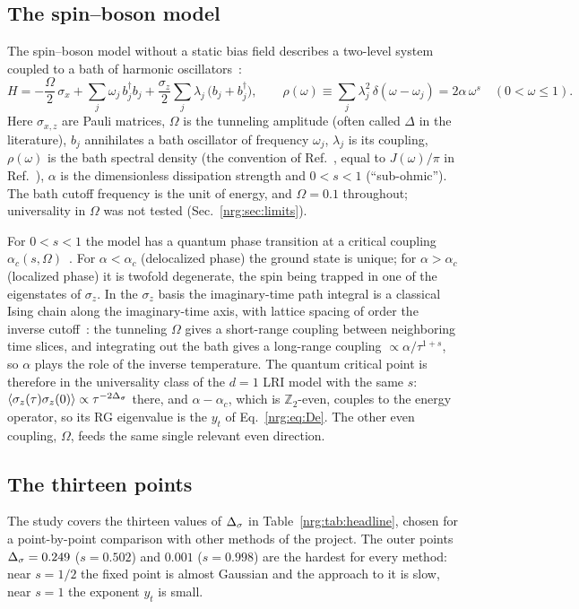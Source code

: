 \subsection{The spin--boson model}
The spin--boson model without a static bias field describes a two-level system coupled to a bath of harmonic
oscillators~\cite{nrg:Leggett1987}:
\begin{equation}
H=-\frac{\Omega}{2}\,\sigma_x+\sum_j\omega_j\,b_j^\dagger b_j+\frac{\sigma_z}{2}\sum_j\lambda_j\,\big(b_j+b_j^\dagger\big),\qquad
\rho(\omega)\equiv\sum_j\lambda_j^2\,\delta(\omega-\omega_j)=2\alpha\,\omega^{s}\quad(0<\omega\le1).
\label{nrg:eq:H}
\end{equation}
Here $\sigma_{x,z}$ are Pauli matrices, $\Omega$ is the tunneling amplitude (often called $\Delta$ in the literature), $b_j$
annihilates a bath oscillator of frequency
$\omega_j$, $\lambda_j$ is its coupling, $\rho(\omega)$ is the bath spectral density (the convention of Ref.~\cite{nrg:Bulla2003}, equal to
$J(\omega)/\pi$ in Ref.~\cite{nrg:Leggett1987}), $\alpha$ is the dimensionless dissipation strength and $0<s<1$ (``sub-ohmic''). The bath
cutoff frequency is the unit of energy, and $\Omega=0.1$ throughout; universality in $\Omega$ was not tested (Sec.~\ref{nrg:sec:limits}).

For $0<s<1$ the model has a quantum phase transition at a critical coupling $\alpha_c(s,\Omega)$~\cite{nrg:Bulla2003,nrg:Vojta2006}. For
$\alpha<\alpha_c$ (delocalized phase) the ground state is unique; for $\alpha>\alpha_c$ (localized phase) it is twofold degenerate,
the spin being trapped in one of the eigenstates of $\sigma_z$. In the $\sigma_z$ basis the imaginary-time path integral is a classical
Ising chain along the imaginary-time axis, with lattice spacing of order the inverse cutoff~\cite{nrg:Leggett1987,nrg:Vojta2006}: the
tunneling $\Omega$ gives a short-range coupling between neighboring time slices, and integrating out the bath gives a long-range
coupling $\propto\alpha/\tau^{1+s}$, so $\alpha$ plays the role of the inverse temperature. The quantum critical point is therefore in
the universality class of the $d=1$ LRI model with the same $s$: $\langle\sigma_z(\tau)\sigma_z(0)\rangle\propto\tau^{-2\Delta_\sigma}$ there,
and $\alpha-\alpha_c$, which is $\mathbb Z_2$-even, couples to the energy operator, so its RG eigenvalue is the $y_t$ of
Eq.~\eqref{nrg:eq:De}. The other even coupling, $\Omega$, feeds the same single relevant even direction.

\subsection{The thirteen points}
The study covers the thirteen values of $\Delta_\sigma$ in Table~\ref{nrg:tab:headline}, chosen for a point-by-point comparison with other methods
of the project. The outer points $\Delta_\sigma=0.249$ ($s=0.502$) and $0.001$ ($s=0.998$) are the hardest for every method: near $s=1/2$ the
fixed point is almost Gaussian and the approach to it is slow, near $s=1$ the exponent $y_t$ is small.

